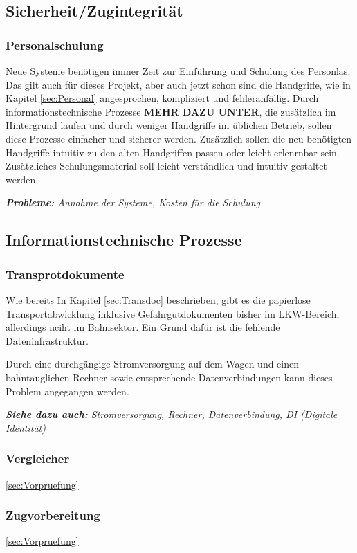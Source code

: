 \subsection{Sicherheit/Zugintegrität}
\subsubsection{Personalschulung}
Neue Systeme benötigen immer Zeit zur Einführung und Schulung des Personlas. Das gilt auch für dieses Projekt, aber auch jetzt schon sind die Handgriffe, wie in Kapitel \ref{sec:Personal} angesprochen, kompliziert und fehleranfällig. Durch informationstechnische Prozesse \textbf{MEHR DAZU UNTER}, die zusätzlich im Hintergrund laufen und durch weniger Handgriffe im üblichen Betrieb, sollen diese Prozesse einfacher und sicherer werden. Zusätzlich sollen die neu benötigten Handgriffe intuitiv zu den alten Handgriffen passen oder leicht erlenrnbar sein. Zusätzliches Schulungsmaterial soll leicht verständlich und intuitiv gestaltet werden.\par
\textit{\textbf{Probleme:} Annahme der Systeme, Kosten für die Schulung}

\subsection{Informationstechnische Prozesse}
\subsubsection{Transprotdokumente}
Wie bereits In Kapitel \ref{sec:Transdoc} beschrieben, gibt es die papierlose Transportabwicklung inklusive Gefahrgutdokumenten bisher im LKW-Bereich, allerdings nciht im Bahnsektor. Ein Grund dafür ist die fehlende Dateninfrastruktur.\par
Durch eine durchgängige Stromversorgung auf dem Wagen und einen bahntauglichen Rechner sowie entsprechende Datenverbindungen kann dieses Problem angegangen werden.\par
\textit{\textbf{Siehe dazu auch:} Stromversorgung, Rechner, Datenverbindung, DI (Digitale Identität)}
\subsubsection{Vergleicher}
\ref{sec:Vorpruefung}
\subsubsection{Zugvorbereitung}
\ref{sec:Vorpruefung}